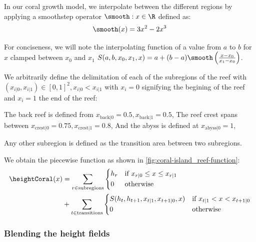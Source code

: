 In our coral growth model, we interpolate between the different regions by applying a smoothstep operator $\smooth: x \in \R$ defined as:
\begin{align}
    \smooth(x) = 3x^2 - 2x^3
\end{align}

For conciseness, we will note the interpolating function of a value from $a$ to $b$ for $x$ clamped between $x_0$ and $x_1$ $S(a, b, x_0, x_1, x) = a + (b-a) \smooth\left(\frac{x - x_0}{x_1 - x_0}\right)$.

We arbitrarily define the delimitation of each of the subregions of the reef with $(x_{i|0}, x_{i|1}) \in [0, 1]^2, x_{i|0} < x_{i|1}$ with $x_i = 0$ signifying the begining of the reef and $x_i = 1$ the end of the reef:
\begin{Itemize}
    \Item{} The back reef is defined from $x_{\text{back}|0} = 0.5, x_{\text{back}|1} = 0.5$,
    \Item{} The reef crest spans between $x_{\text{crest}|0} = 0.75, x_{\text{crest}|1} = 0.8$,
    \Item{} And the abyss is defined at $x_{\text{abyss}|0} = 1$,
\end{Itemize}
Any other subregion is defined as the transition area between two subregions.

We obtain the piecewise function as shown in \cref{fig:coral-island_reef-function}:
\begin{align}
    \heightCoral(x) &= \sum_{r \in \text{subregions}}{
    \begin{dcases}
        h_r & \text{if } x_{r|0} \leq x \leq x_{r|1} \\
        0 & \text{otherwise}
    \end{dcases}
    } \nonumber \\ 
    &+
    \sum_{t \in \text{transitions}} {
        \begin{dcases}
            S(h_{t}, h_{t+1}, x_{t|1}, x_{t+1|0}, x) & \text{if } x_{t|1} < x < x_{t+1|0} \\
            0 & \text{otherwise}
        \end{dcases}
    }
\end{align}



\subsubsection{Blending the height fields}

